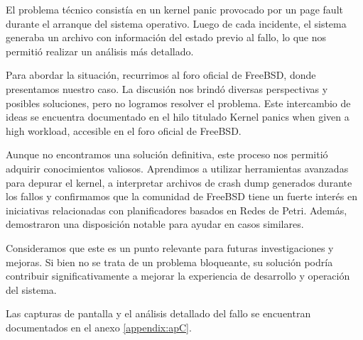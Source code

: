 El problema técnico consistía en un kernel panic provocado por un page fault durante el arranque del sistema operativo. Luego de cada incidente, el sistema generaba un archivo con información del estado previo al fallo, lo que nos permitió realizar un análisis más detallado.\par

Para abordar la situación, recurrimos al foro oficial de FreeBSD, donde presentamos nuestro caso. La discusión nos brindó diversas perspectivas y posibles soluciones, pero no logramos resolver el problema. Este intercambio de ideas se encuentra documentado en el hilo titulado Kernel panics when given a high workload, accesible en el foro oficial de FreeBSD\cite{bib6}.\par

Aunque no encontramos una solución definitiva, este proceso nos permitió adquirir conocimientos valiosos. Aprendimos a utilizar herramientas avanzadas para depurar el kernel, a interpretar archivos de crash dump generados durante los fallos y confirmamos que la comunidad de FreeBSD tiene un fuerte interés en iniciativas relacionadas con planificadores basados en Redes de Petri. Además, demostraron una disposición notable para ayudar en casos similares.\par

Consideramos que este es un punto relevante para futuras investigaciones y mejoras. Si bien no se trata de un problema bloqueante, su solución podría contribuir significativamente a mejorar la experiencia de desarrollo y operación del sistema.\par

Las capturas de pantalla y el análisis detallado del fallo se encuentran documentados en el anexo \ref{appendix:apC}.\par